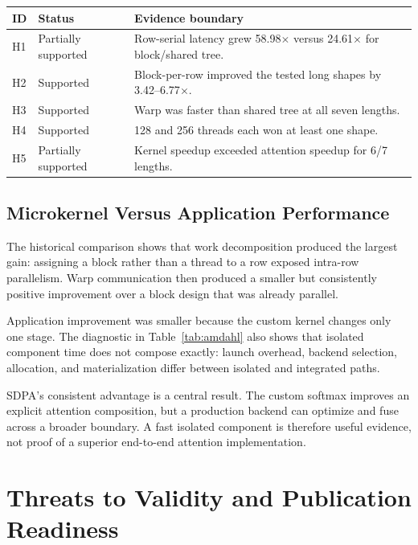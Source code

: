 \documentclass[twoside,twocolumn,10pt]{article}
\begin{document}
\begin{center}
\begin{minipage}{\columnwidth}
\centering
{}
\label{tab:hypotheses}
\begin{tabular}{C{0.45cm}L{2.25cm}L{3.6cm}}
\toprule
ID & Status & Evidence boundary \\
\midrule
H1 & Partially supported & Row-serial latency grew 58.98$\times$ versus 24.61$\times$ for block/shared tree. \\
H2 & Supported & Block-per-row improved the tested long shapes by 3.42--6.77$\times$. \\
H3 & Supported & Warp was faster than shared tree at all seven lengths. \\
H4 & Supported & 128 and 256 threads each won at least one shape. \\
H5 & Partially supported & Kernel speedup exceeded attention speedup for 6/7 lengths. \\
\bottomrule
\end{tabular}
\end{minipage}
\end{center}

\subsection{Microkernel Versus Application Performance}

The historical comparison shows that work decomposition produced the largest
gain: assigning a block rather than a thread to a row exposed intra-row
parallelism. Warp communication then produced a smaller but consistently
positive improvement over a block design that was already parallel.

Application improvement was smaller because the custom kernel changes only one
stage. The diagnostic in Table~\ref{tab:amdahl} also shows that isolated
component time does not compose exactly: launch overhead, backend selection,
allocation, and materialization differ between isolated and integrated paths.

SDPA's consistent advantage is a central result. The custom softmax improves an
explicit attention composition, but a production backend can optimize and fuse
across a broader boundary. A fast isolated component is therefore useful
evidence, not proof of a superior end-to-end attention implementation.

\section{Threats to Validity and Publication Readiness}
\end{document}
